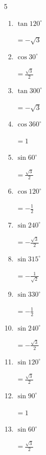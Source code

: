 \begin{multicols}{5}
\begin{enumerate}
  \item $\displaystyle \tan{120^\circ}$

        $\displaystyle =-\sqrt{3}$

  \item $\displaystyle \cos{30^\circ}$

        $\displaystyle =\frac{\sqrt{3}}{2}$

  \item $\displaystyle \tan{300^\circ}$

        $\displaystyle =-\sqrt{3}$

  \item $\displaystyle \cos{360^\circ}$

        $\displaystyle =1$

  \item $\displaystyle \sin{60^\circ}$

        $\displaystyle =\frac{\sqrt{3}}{2}$

  \item $\displaystyle \cos{120^\circ}$

        $\displaystyle =-\frac{1}{2}$

  \item $\displaystyle \sin{240^\circ}$

        $\displaystyle =-\frac{\sqrt{3}}{2}$

  \item $\displaystyle \sin{315^\circ}$

        $\displaystyle =-\frac{1}{\sqrt{2}}$

  \item $\displaystyle \sin{330^\circ}$

        $\displaystyle =-\frac{1}{2}$

\columnbreak %

  \item $\displaystyle \sin{240^\circ}$

        $\displaystyle =-\frac{\sqrt{3}}{2}$

  \item $\displaystyle \sin{120^\circ}$

        $\displaystyle =\frac{\sqrt{3}}{2}$

  \item $\displaystyle \sin{90^\circ}$

        $\displaystyle =1$

  \item $\displaystyle \sin{60^\circ}$

        $\displaystyle =\frac{\sqrt{3}}{2}$


\end{enumerate}
\end{multicols}
